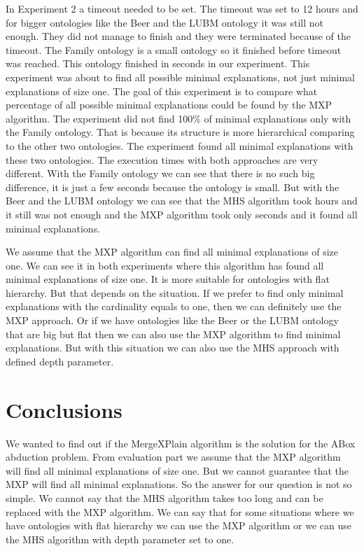 \documentclass[12pt,a4paper]{article}
\begin{document}
In Experiment 2 a timeout needed to be set. The timeout was set to 12 hours and for bigger ontologies like the Beer and the LUBM ontology it was still not enough. They did not manage to finish and they were terminated because of the timeout. The Family ontology is a small ontology so it finished before timeout was reached. This ontology finished in seconds in our experiment. This experiment was about to find all possible minimal explanations, not just minimal explanations of size one. The goal of this experiment is to compare what percentage of all possible minimal explanations could be found by the MXP algorithm. The experiment did not find 100\% of minimal explanations only with the Family ontology. That is because its structure is more hierarchical comparing to the other two ontologies. The experiment found all minimal explanations with these two ontologies. The execution times with both approaches are very different. With the Family ontology we can see that there is no such big difference, it is just a few seconds because the ontology is small. But with the Beer and the LUBM ontology we can see that the MHS algorithm took hours and it still was not enough and the MXP algorithm took only seconds and it found all minimal explanations.

We assume that the MXP algorithm can find all minimal explanations of size one. We can see it in both experiments where this algorithm has found all minimal explanations of size one. It is more suitable for ontologies with flat hierarchy. But that depends on the situation. If we prefer to find only minimal explanations with the cardinality equals to one, then we can definitely use the MXP approach. Or if we have ontologies like the Beer or the LUBM ontology that are big but flat then we can also use the MXP algorithm to find minimal explanations. But with this situation we can also use the MHS approach with defined depth parameter.

\pagebreak
\section{Conclusions}
We wanted to find out if the MergeXPlain algorithm is the solution for the ABox abduction problem. From evaluation part we assume that the MXP algorithm will find all minimal explanations of size one. But we cannot guarantee that the MXP will find all minimal explanations. So the answer for our question is not so simple. We cannot say that the MHS algorithm takes too long and can be replaced with the MXP algorithm. We can say that for some situations where we have ontologies with flat hierarchy we can use the MXP algorithm or we can use the MHS algorithm with depth parameter set to one.
\end{document}
